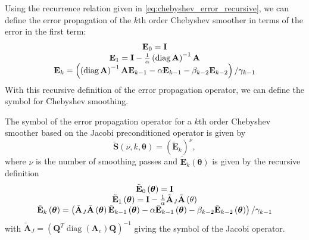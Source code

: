 \documentclass[review]{siamart190516}
\DeclareMathOperator{\diag}{diag}
\begin{document}
Using the recurrence relation given in \cref{eq:chebyshev_error_recursive}, we can define the error propagation of the $k$th order Chebyshev smoother in terms of the error in the first term:
\begin{equation}
\begin{tabular}{c}
$\mathbf{E}_0 = \mathbf{I}$\\
$\mathbf{E}_1 = \mathbf{I} - \frac{1}{\alpha} \left( \diag {\mathbf{A}} \right)^{-1} {\mathbf{A}}$\\
$\mathbf{E}_k = \left(\left( \diag {\mathbf{A}} \right)^{-1} {\mathbf{A}} \mathbf{E}_{k - 1} - \alpha \mathbf{E}_{k - 1} - \beta_{k - 2} \mathbf{E}_{k - 2} \right) / \gamma_{k - 1}$
\end{tabular}
\label{eq:chebyshev_error_propagation}
\end{equation}
With this recursive definition of the error propagation operator, we can define the symbol for Chebyshev smoothing.

\begin{definition}\label{def:chebyshev_symbol}
The symbol of the error propagation operator for a $k$th order Chebyshev smoother based on the Jacobi preconditioned operator is given by
\begin{equation}
\tilde{\mathbf{S}} \left( \nu, k, \boldsymbol{\theta} \right) = \left( \tilde{\mathbf{E}}_k \right)^\nu,
\end{equation}
where $\nu$ is the number of smoothing passes and $\tilde{\mathbf{E}}_k \left( \mathbf{\boldsymbol{\theta}} \right)$ is given by the recursive definition
\begin{equation}
\begin{tabular}{c}
$\tilde{\mathbf{E}}_0 \left( \boldsymbol{\theta} \right) = \mathbf{I}$\\
$\tilde{\mathbf{E}}_1 \left( \boldsymbol{\theta} \right) = \mathbf{I} - \frac{1}{\alpha} \tilde{\mathbf{A}}_J \tilde{\mathbf{A}} \left( \mathbf{\theta} \right)$\\
$\tilde{\mathbf{E}}_k \left( \boldsymbol{\theta} \right) = \left( \tilde{\mathbf{A}}_J \tilde{\mathbf{A}} \left( \boldsymbol{\theta} \right) \tilde{\mathbf{E}}_{k - 1} \left( \boldsymbol{\theta} \right) - \alpha \tilde{\mathbf{E}}_{k - 1} \left( \boldsymbol{\theta} \right) - \beta_{k - 2} \tilde{\mathbf{E}}_{k - 2} \left( \boldsymbol{\theta} \right) \right) / \gamma_{k - 1}$
\end{tabular}
\end{equation}
with $\tilde{\mathbf{A}}_J = \left( \mathbf{Q}^T \diag \left( \mathbf{A}_e \right) \mathbf{Q} \right)^{-1}$ giving the symbol of the Jacobi operator.
\end{definition}
\end{document}
